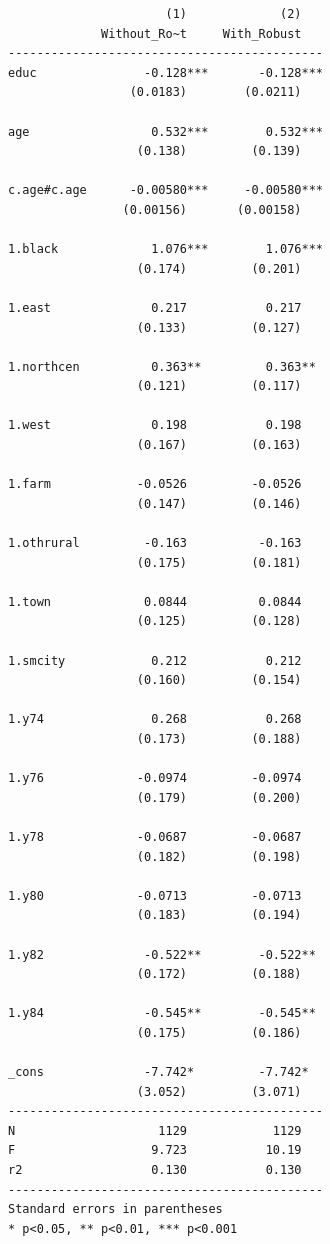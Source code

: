 \documentclass[
]{book}
\begin{document}
\begin{verbatim}
                      (1)             (2)   
             Without_Ro~t     With_Robust   
--------------------------------------------
educ               -0.128***       -0.128***
                 (0.0183)        (0.0211)   

age                 0.532***        0.532***
                  (0.138)         (0.139)   

c.age#c.age      -0.00580***     -0.00580***
                (0.00156)       (0.00158)   

1.black             1.076***        1.076***
                  (0.174)         (0.201)   

1.east              0.217           0.217   
                  (0.133)         (0.127)   

1.northcen          0.363**         0.363** 
                  (0.121)         (0.117)   

1.west              0.198           0.198   
                  (0.167)         (0.163)   

1.farm            -0.0526         -0.0526   
                  (0.147)         (0.146)   

1.othrural         -0.163          -0.163   
                  (0.175)         (0.181)   

1.town             0.0844          0.0844   
                  (0.125)         (0.128)   

1.smcity            0.212           0.212   
                  (0.160)         (0.154)   

1.y74               0.268           0.268   
                  (0.173)         (0.188)   

1.y76             -0.0974         -0.0974   
                  (0.179)         (0.200)   

1.y78             -0.0687         -0.0687   
                  (0.182)         (0.198)   

1.y80             -0.0713         -0.0713   
                  (0.183)         (0.194)   

1.y82              -0.522**        -0.522** 
                  (0.172)         (0.188)   

1.y84              -0.545**        -0.545** 
                  (0.175)         (0.186)   

_cons              -7.742*         -7.742*  
                  (3.052)         (3.071)   
--------------------------------------------
N                    1129            1129   
F                   9.723           10.19   
r2                  0.130           0.130   
--------------------------------------------
Standard errors in parentheses
* p<0.05, ** p<0.01, *** p<0.001
\end{verbatim}
\end{document}
